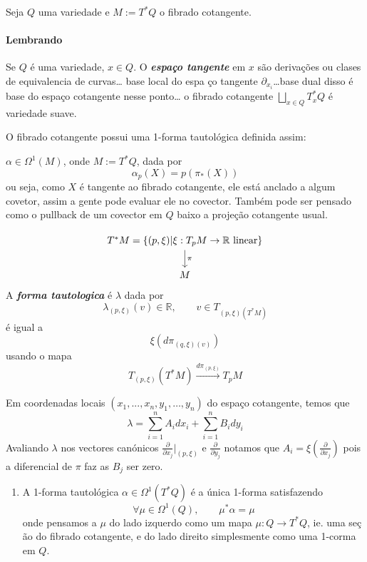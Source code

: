 Seja $Q$ uma variedade e $M :=T^* Q$ o fibrado cotangente.

\paragraph{Lembrando} Se $Q$ \'e uma variedade, $x\in Q$. O \textit{\textbf{espa\c co tangente}} em $ x$ s\~ao derivaç\~oes ou clases de equivalencia de curvas… base local do espa \c co tangente $\partial_{x_i}$…base dual disso \'e base do espa\c co cotangente nesse ponto… o fibrado cotangente $\bigsqcup_{x\in Q}T^*_{x}Q$ \'e variedade suave.

O fibrado cotangente possui uma 1-forma tautol\'ogica definida assim:

\begin{defn}
	$\alpha\in\Omega^{1}(M)$, onde $M:=T^*Q$, dada por
	\[\alpha_p(X)=p(\pi_*(X))\]
	ou seja, como $X$ \'e tangente ao fibrado cotangente, ele est\'a anclado a algum covetor, assim a gente pode evaluar ele no covector. Tamb\'em pode ser pensado como o pullback de um covector em $Q$ baixo a proje\c c\~ao cotangente usual.
\end{defn}

\begin{defn}[Monitoria]
	\[\begin{tikzcd}
		T^*M=\{(p,\xi)|\xi:T_pM\to \mathbb{R}\text{ linear} \} \arrow[d,"\pi"]\\
		M
	\end{tikzcd}\]
	A \textit{\textbf{forma tautologica}}  \'e $\lambda$ dada por
	\[\lambda_{(p,\xi)}(v)\in\mathbb{R},\qquad v\in T_{(p,\xi)(T^*M)}\]
	\'e igual a
	\[\xi(d\pi_{(q,\xi)(v)})\]
	usando o mapa
\[T_{(p,\xi)}(T^* M)\overset{d\pi_{(p,\xi)}}{\longrightarrow}T_{p}M\]
\end{defn}

Em coordenadas locais $(x_1,...,x_n,y_1,\ldots,y_n)$ do espaço cotangente, temos que
\[\lambda=\sum_{i=1}^nA_i dx_i+\sum_{i=1}^nB_i dy_i\]
Avaliando $\lambda$ nos vectores can\'onicos $\frac{\partial}{\partial x_j}\Big|_{(p,\xi)}$ e $\frac{\partial}{\partial y_j}$ notamos que $A_i=\xi\left( \frac{\partial}{\partial x_j} \right) $ pois a diferencial de $\pi$ faz as $B_j$ ser zero.

\begin{exercise}\leavevmode 
	\begin{enumerate}
		\item A 1-forma tautol\'ogica $\alpha\in\Omega^{1}(T^*Q)$ \'e a \'unica 1-forma satisfazendo
			\[\forall \mu\in\Omega^{1}(Q),\qquad \mu^*\alpha=\mu\]
			onde pensamos a $\mu$ do lado izquerdo como um mapa  $\mu:Q\to T^*Q$, ie. uma se\c c \~ao do fibrado cotangente, e do lado direito simplesmente como uma 1-corma em $Q$.

	\end{enumerate}
\end{exercise}

